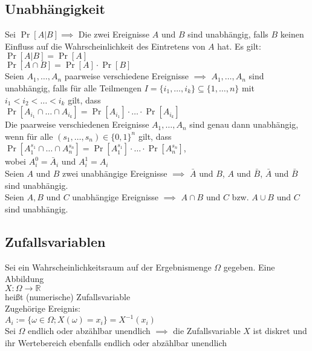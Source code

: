 \documentclass[a4paper,9pt]{extarticle}
\begin{document}
\subsection*{Unabhängigkeit}
Sei $\Pr[A|B] \implies$ Die zwei Ereignisse $A$ und $B$ sind unabhängig, falls $B$ keinen Einfluss auf die Wahrscheinlichkeit des Eintretens von $A$ hat. Es gilt: \\
$\Pr[A|B] = \Pr[A]$ \\
$\Pr[A \cap B] = \Pr[A] ⋅ \Pr[B]$ \\

Seien $A_1, \dots, A_n$ paarweise verschiedene Ereignisse $\implies$  $A_1, \dots, A_n$ sind unabhängig, falls für alle Teilmengen $I = \{i_1, \dots, i_k\} \subseteq \{1, \dots, n\}$ mit $i_1 < i_2 < \dots < i_k$ gilt, dass \\
$\Pr[A_{i_1} \cap \dots \cap A_{i_k}] = \Pr[A_{i_1}] ⋅ \dots ⋅ \Pr[A_{i_k}]$\\

Die paarweise verschiedenen Ereignisse $A_1, \dots, A_n$ sind genau dann unabhängig, wenn für alle $(s_1, \dots, s_n) \in \{0,1\}^n$ gilt, dass \\
$\Pr[A_1^{s_1} \cap \dots \cap A_n^{s_n}] = \Pr[A_1^{s_1}] ⋅ \dots ⋅ \Pr[A_n^{s_n}]$,\\
wobei $A_i^0 = \bar{A}_i$ und $A_i^1 = A_i$ \\

Seien $A$ und $B$ zwei unabhängige Ereignisse $\implies$ $\bar{A}$ und $B$, $A$ und $\bar{B}$, $\bar{A}$ und $\bar{B}$ sind unabhängig.\\

Seien $A, B$ und $C$ unabhängige Ereignisse $\implies$ $A \cap B$ und $C$ bzw. $A \cup B$ und $C$ sind unabhängig.

\subsection*{Zufallsvariablen}
Sei ein Wahrscheinlichkeitsraum auf der Ergebnismenge $\Omega$ gegeben. Eine Abbildung \\
$X : \Omega → \mathbb{R}$ \\
heißt (numerische) Zufallsvariable\\

Zugehörige Ereignis: \\
$A_i := \{\omega \in \Omega; X(\omega) = x_i\} = X^{-1}(x_i)$ \\

Sei $\Omega$ endlich oder abzählbar unendlich $\implies$ die Zufallsvariable $X$ ist diskret und ihr Wertebereich ebenfalls endlich oder abzählbar unendlich
\end{document}

